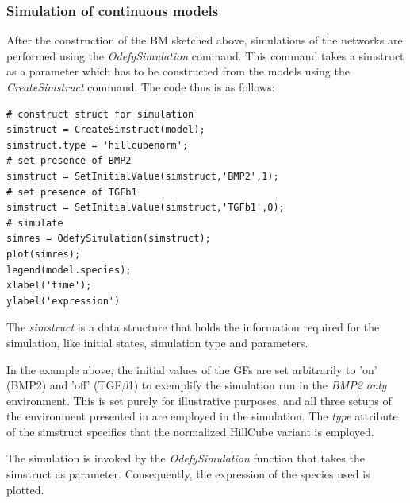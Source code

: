 \documentclass[11pt]{article}
\begin{document}
\begin{appendices}
\subsubsection*{Simulation of continuous models} \label{sssec:simulationCM}
After the construction of the BM sketched above, simulations of the networks are performed using the \textit{OdefySimulation} command. This command takes a simstruct as a parameter which has to be constructed from the models using the \textit{CreateSimstruct} command. The code thus is as follows:
\begin{lstlisting}
# construct struct for simulation
simstruct = CreateSimstruct(model);
simstruct.type = 'hillcubenorm';
# set presence of BMP2
simstruct = SetInitialValue(simstruct,'BMP2',1);
# set presence of TGFb1
simstruct = SetInitialValue(simstruct,'TGFb1',0);
# simulate
simres = OdefySimulation(simstruct);
plot(simres);
legend(model.species);
xlabel('time');
ylabel('expression')
\end{lstlisting}

The \textit{simstruct} is a data structure that holds the information required for the simulation, like initial states, simulation type and parameters.

In the example above, the initial values of the GFs are set arbitrarily to 'on' (BMP2) and 'off' (TGF$\beta$1) to exemplify the simulation run in the \textit{BMP2 only} environment. This is set purely for illustrative purposes, and all three
setups of the environment presented in \cite{Kirkham} are employed in the simulation. The \textit{type} attribute of the simstruct specifies that the normalized HillCube variant is employed.

The simulation is invoked by the \textit{OdefySimulation} function that takes the simstruct as parameter. Consequently, the expression of the species used is plotted.

\end{appendices}

{}

\end{document}
